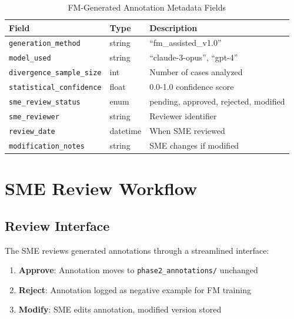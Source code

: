 \documentclass[11pt,a4paper]{article}
\begin{document}
\begin{table}[H]
\centering
\caption{FM-Generated Annotation Metadata Fields}
\begin{tabular}{lll}
\toprule
\textbf{Field} & \textbf{Type} & \textbf{Description} \\
\midrule
\texttt{generation\_method} & string & ``fm\_assisted\_v1.0'' \\
\texttt{model\_used} & string & ``claude-3-opus'', ``gpt-4'' \\
\texttt{divergence\_sample\_size} & int & Number of cases analyzed \\
\texttt{statistical\_confidence} & float & 0.0-1.0 confidence score \\
\texttt{sme\_review\_status} & enum & pending, approved, rejected, modified \\
\texttt{sme\_reviewer} & string & Reviewer identifier \\
\texttt{review\_date} & datetime & When SME reviewed \\
\texttt{modification\_notes} & string & SME changes if modified \\
\bottomrule
\end{tabular}
\end{table}

\section{SME Review Workflow}

\subsection{Review Interface}

The SME reviews generated annotations through a streamlined interface:

\begin{enumerate}
    \item \textbf{Approve}: Annotation moves to \texttt{phase2\_annotations/} unchanged
    \item \textbf{Reject}: Annotation logged as negative example for FM training
    \item \textbf{Modify}: SME edits annotation, modified version stored
\end{enumerate}
\end{document}
